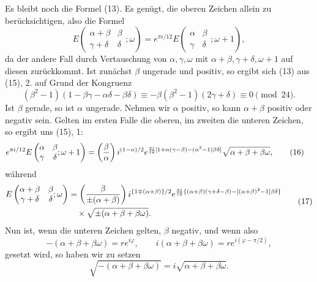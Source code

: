 \documentclass[11pt]{article}
\newcommand{\Jac}[2]{\left(\frac{#1}{#2}\right)}
\begin{document}
Es bleibt noch die Formel (13). Es genügt, die oberen Zeichen allein zu berücksichtigen, also die Formel
\[
E\left(\begin{matrix}\alpha+\beta&\beta\\ \gamma+\delta&\delta\end{matrix};\omega\right)
=e^{\pi i/12}E\left(\begin{matrix}\alpha&\beta\\ \gamma&\delta\end{matrix};\omega+1\right),
\]
da der andere Fall durch Vertauschung von $\alpha,\gamma,\omega$ mit $\alpha+\beta,\gamma+\delta,
\omega+1$ auf diesen zurückkommt. Ist zunächst $\beta$ ungerade und positiv, so ergibt sich (13) aus (15), 2. auf Grund der Kongruenz
\[
(\beta^2-1)(1-\beta\gamma-\alpha\delta-\beta\delta)
\equiv-\beta(\beta^2-1)(2\gamma+\delta)\equiv0\pmod{24}.
\]
Ist $\beta$ gerade, so ist $\alpha$ ungerade. Nehmen wir $\alpha$ positiv, so kann $\alpha+\beta$ positiv oder negativ sein. Gelten im ersten Falle die oberen, im zweiten die unteren Zeichen, so ergibt uns (15), 1:
\begin{align}
e^{\pi i/12}E\left(\begin{matrix}\alpha&\beta\\ \gamma&\delta\end{matrix};\omega+1\right)
&=\Jac{\beta}{\alpha}i^{(1-\alpha)/2}
 e^{{\pi i\over12}[1+\alpha(\gamma-\beta)-(\alpha^2-1)\beta\delta]}
\sqrt{\alpha+\beta+\beta\omega}, \tag{16}
\end{align}
während
\begin{equation}
\begin{aligned}
E\left(\begin{matrix}\alpha+\beta&\beta\\ \gamma+\delta&\delta\end{matrix};\omega\right)
&=\Jac{\beta}{\pm(\alpha+\beta)}
 i^{\{1\mp(\alpha+\beta)\}/2}
 e^{{\pi i\over12}\{(\alpha+\beta)(\gamma+\delta-\beta)-[(\alpha+\beta)^2-1]\beta\delta\}}\\
&\quad\times \sqrt{\pm(\alpha+\beta+\beta\omega)} .
\end{aligned}
\tag{17}
\end{equation}
Nun ist, wenn die unteren Zeichen gelten, $\beta$ negativ, und wenn also
\[
-(\alpha+\beta+\beta\omega)=re^{i\varphi},
\qquad
 i(\alpha+\beta+\beta\omega)=re^{i(\varphi-\pi/2)},
\]
gesetzt wird, so haben wir zu setzen
\[
\sqrt{-(\alpha+\beta+
\beta\omega)}=i\sqrt{\alpha+\beta+\beta\omega}.
\]
\end{document}
